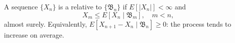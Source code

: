 A sequence $\{X_n\}$ is a  relative to $\{\mathfrak{B}_n\}$ if $E[|X_n|] < \infty$ and
$$X_m \leq E[X_n \mid \mathfrak{B}_m], \quad m < n,$$
almost surely. Equivalently, $E[X_{n+1} - X_n \mid \mathfrak{B}_n] \geq 0$: the process tends to increase on average.
